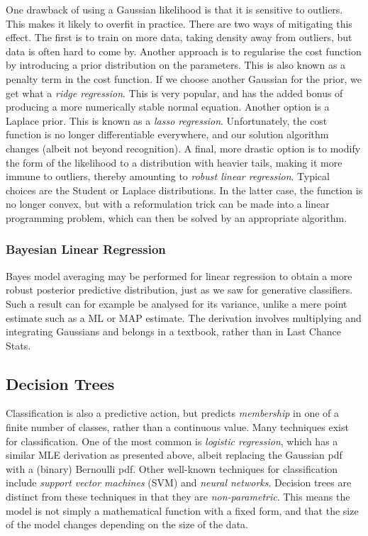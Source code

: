 \documentclass[11pt]{amsart}
\begin{document}
One drawback of using a Gaussian likelihood is that it is sensitive to outliers. This makes it likely to overfit in practice. There are two ways of mitigating this effect. The first is to train on more data, taking density away from outliers, but data is often hard to come by. Another approach is to regularise the cost function by introducing a prior distribution on the parameters. This is also known as a penalty term in the cost function. If we choose another Gaussian for the prior, we get what a \emph{ridge regression}. This is very popular, and has the added bonus of producing a more numerically stable normal equation. Another option is a Laplace prior. This is known as a \emph{lasso regression}. Unfortunately, the cost function is no longer differentiable everywhere, and our solution algorithm changes (albeit not beyond recognition). A final, more drastic option is to modify the form of the likelihood to a distribution with heavier tails, making it more immune to outliers, thereby amounting to \emph{robust linear regression}. Typical choices are the Student or Laplace distributions. In the latter case, the function is no longer convex, but with a reformulation trick can be made into a linear programming problem, which can then be solved by an appropriate algorithm.

\subsubsection{Bayesian Linear Regression}

Bayes model averaging may be performed for linear regression to obtain a more robust posterior predictive distribution, just as we saw for generative classifiers. Such a result can for example be analysed for its variance, unlike a mere point estimate such as a ML or MAP estimate. The derivation involves multiplying and integrating Gaussians and belongs in a textbook, rather than in Last Chance Stats.

\subsection{Decision Trees}

Classification is also a predictive action, but predicts \emph{membership} in one of a finite number of classes, rather than a continuous value. Many techniques exist for classification. One of the most common is \emph{logistic regression}, which has a similar MLE derivation as presented above, albeit replacing the Gaussian pdf with a (binary) Bernoulli pdf. Other well-known techniques for classification include \emph{support vector machines} (SVM) and \emph{neural networks}. Decision trees are distinct from these techniques in that they are \emph{non-parametric}. This means the model is not simply a mathematical function with a fixed form, and that the size of the model changes depending on the size of the data.
\end{document}
